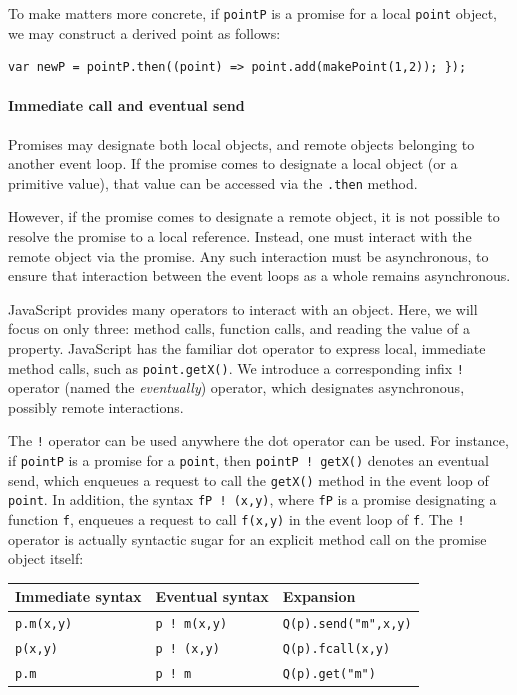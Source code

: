 \documentclass{llncs}
\begin{document}
To make matters more concrete, if {\tt pointP} is a promise for a local {\tt point} object, we may construct a derived point as follows:

\begin{verbatim}
var newP = pointP.then((point) => point.add(makePoint(1,2)); });
\end{verbatim}

\paragraph{Immediate call and eventual send}

Promises may designate both local objects, and remote objects belonging to another event loop. If the promise comes to designate a local object (or a primitive value), that value can be accessed via the {\tt .then} method.

However, if the promise comes to designate a remote object, it is not possible to resolve the promise to a local reference. Instead, one must interact with the remote object via the promise. Any such interaction must be asynchronous, to ensure that interaction between the event loops as a whole remains asynchronous.

JavaScript provides many operators to interact with an object. Here, we will focus on only three: method calls, function calls, and reading the value of a property. JavaScript has the familiar dot operator to express local, immediate method calls, such as {\tt point.getX()}. We introduce a corresponding infix {\tt !} operator (named the \emph{eventually}) operator, which designates asynchronous, possibly remote interactions.

The {\tt !} operator can be used anywhere the dot operator can be used. For instance, if {\tt pointP} is a promise for a {\tt point}, then {\tt pointP ! getX()} denotes an eventual send, which enqueues a request to call the {\tt getX()} method in the event loop of {\tt point}. In addition, the syntax {\tt fP ! (x,y)}, where {\tt fP} is a promise designating a function {\tt f}, enqueues a request to call {\tt f(x,y)} in the event loop of {\tt f}. The {\tt !} operator is actually syntactic sugar for an explicit method call on the promise object itself:

\begin{center}
  \begin{tabular}{ l|l|l }
  Immediate syntax & Eventual syntax & Expansion \\
  \hline
  {\tt p.m(x,y)} & {\tt p ! m(x,y)} & {\tt Q(p).send("m",x,y)} \\
  {\tt p(x,y)} & {\tt p ! (x,y)} & {\tt Q(p).fcall(x,y)}\\
  {\tt p.m} & {\tt p ! m} & {\tt Q(p).get("m")}\\
  \end{tabular} 
\end{center}
\end{document}
